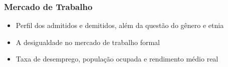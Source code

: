 \documentclass[12pt,aspectratio=169]{beamer}
\begin{document}
\begin{frame}
	\frametitle{Mercado de Trabalho}
\begin{itemize}
	\item Perfil dos admitidos e demitidos, além da questão do gênero e etnia
	\item A desigualdade no mercado de trabalho formal
	\item Taxa de desemprego, população ocupada e rendimento médio real
\end{itemize}

\begin{figure}%
	\centering
	\qquad
	
\end{figure}


\end{frame}
\end{document}
